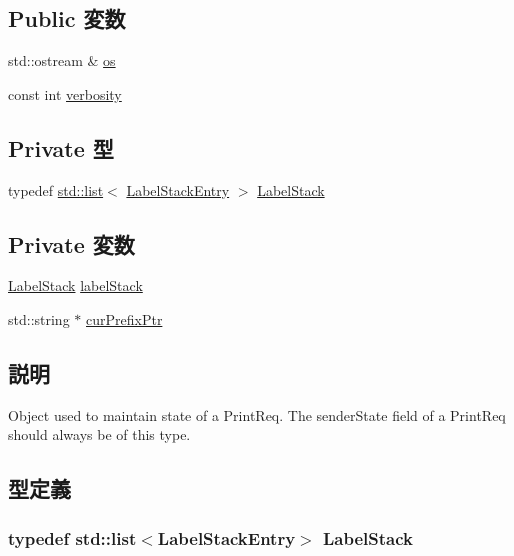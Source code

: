 \subsection*{Public 変数}
\begin{DoxyCompactItemize}
\item 
std::ostream \& \hyperlink{classPacket_1_1PrintReqState_a1a917786b846a8a836dd09f6970db62a}{os}
\item 
const int \hyperlink{classPacket_1_1PrintReqState_ae2bc69d2191ab7552502f23bee9f8295}{verbosity}
\end{DoxyCompactItemize}
\subsection*{Private 型}
\begin{DoxyCompactItemize}
\item 
typedef \hyperlink{classstd_1_1list}{std::list}$<$ \hyperlink{structPacket_1_1PrintReqState_1_1LabelStackEntry}{LabelStackEntry} $>$ \hyperlink{classPacket_1_1PrintReqState_a4b65145a78e94ca9e3e1e4cb81d6852f}{LabelStack}
\end{DoxyCompactItemize}
\subsection*{Private 変数}
\begin{DoxyCompactItemize}
\item 
\hyperlink{classstd_1_1list}{LabelStack} \hyperlink{classPacket_1_1PrintReqState_a4e8dbaefec458a8dd7b66a5e8c20db04}{labelStack}
\item 
std::string $\ast$ \hyperlink{classPacket_1_1PrintReqState_a3a19280cb30a487c3097469433fb9aba}{curPrefixPtr}
\end{DoxyCompactItemize}


\subsection{説明}
Object used to maintain state of a PrintReq. The senderState field of a PrintReq should always be of this type. 

\subsection{型定義}
\hypertarget{classPacket_1_1PrintReqState_a4b65145a78e94ca9e3e1e4cb81d6852f}{
\subsubsection[{LabelStack}]{\setlength{\rightskip}{0pt plus 5cm}typedef {\bf std::list}$<${\bf LabelStackEntry}$>$ {\bf LabelStack}}}
\label{classPacket_1_1PrintReqState_a4b65145a78e94ca9e3e1e4cb81d6852f}


